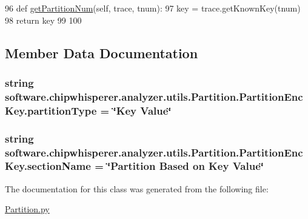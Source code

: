 \begin{DoxyCode}
96     \textcolor{keyword}{def }\hyperlink{classsoftware_1_1chipwhisperer_1_1analyzer_1_1utils_1_1Partition_1_1PartitionEncKey_a422e6af196ab146fb57ad9ff3e83475d}{getPartitionNum}(self, trace, tnum):
97         key = trace.getKnownKey(tnum)
98         \textcolor{keywordflow}{return} key
99 
100 
\end{DoxyCode}


\subsection{Member Data Documentation}
\hypertarget{classsoftware_1_1chipwhisperer_1_1analyzer_1_1utils_1_1Partition_1_1PartitionEncKey_a43e21ae27401f13b820d68ed36120133}{}
\subsubsection[{partition\+Type}]{\setlength{\rightskip}{0pt plus 5cm}string software.\+chipwhisperer.\+analyzer.\+utils.\+Partition.\+Partition\+Enc\+Key.\+partition\+Type = \char`\"{}Key Value\char`\"{}\hspace{0.3cm}{\ttfamily [static]}}\label{classsoftware_1_1chipwhisperer_1_1analyzer_1_1utils_1_1Partition_1_1PartitionEncKey_a43e21ae27401f13b820d68ed36120133}
\hypertarget{classsoftware_1_1chipwhisperer_1_1analyzer_1_1utils_1_1Partition_1_1PartitionEncKey_a2832fddf895a8280a5b33972a2ff0985}{}
\subsubsection[{section\+Name}]{\setlength{\rightskip}{0pt plus 5cm}string software.\+chipwhisperer.\+analyzer.\+utils.\+Partition.\+Partition\+Enc\+Key.\+section\+Name = \char`\"{}Partition Based on Key Value\char`\"{}\hspace{0.3cm}{\ttfamily [static]}}\label{classsoftware_1_1chipwhisperer_1_1analyzer_1_1utils_1_1Partition_1_1PartitionEncKey_a2832fddf895a8280a5b33972a2ff0985}


The documentation for this class was generated from the following file\+:\begin{DoxyCompactItemize}
\item 
\hyperlink{Partition_8py}{Partition.\+py}\end{DoxyCompactItemize}
